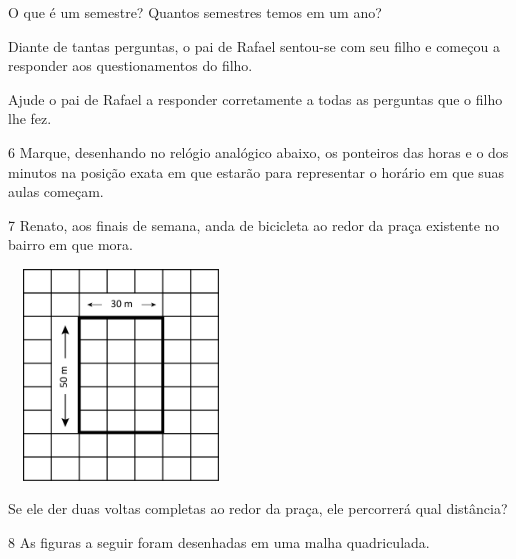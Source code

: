 \begin{multicols}{2}
O que é um semestre? 
Quantos semestres temos em um ano?

Diante de tantas perguntas, o pai de Rafael sentou-se com seu filho e
começou a responder aos questionamentos do filho.

Ajude o pai de Rafael a responder corretamente a todas as perguntas que o filho lhe fez.


\num{6} Marque, desenhando no relógio analógico abaixo, os ponteiros das horas e o dos
minutos na posição exata em que estarão para representar o horário em que
suas aulas começam.




\num{7} Renato, aos finais de semana, anda de bicicleta ao redor da praça existente no bairro em que mora.


\includegraphics[width=2.35256in,height=2.20730in]{media/image55.png}

Se ele der duas voltas completas ao redor da praça, ele percorrerá qual distância?



\num{8} As figuras a seguir foram desenhadas em uma malha quadriculada.



\end{multicols}
